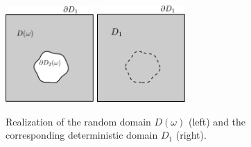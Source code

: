 \begin{figure}[t!]
	\centering
    \includegraphics[width=0.3\textwidth]{rand_geom_1_1_stoch}
    \qquad \hspace{5mm} \qquad
    \includegraphics[width=0.3\textwidth]{rand_geom_1_1_ref}
	\caption[Realization of the random domain.]{ Realization of the random domain $D(\omega)$ (left) and the corresponding deterministic domain $D_1$ (right). }
	\label{fig:geom}
\end{figure}


